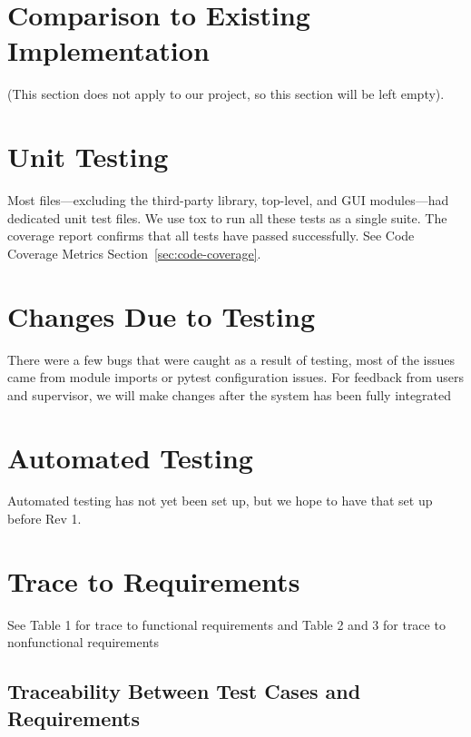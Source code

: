 \documentclass[12pt, titlepage]{article}
\begin{document}
\section{Comparison to Existing Implementation}	

(This section does not apply to our project, so this section will be left empty).

\section{Unit Testing}
Most files—excluding the third-party library, top-level, and GUI modules—had dedicated unit test files. 
We use tox to run all these tests as a single suite. 
The coverage report confirms that all tests have passed successfully. 
See Code Coverage Metrics Section~\ref{sec:code-coverage}.

\section{Changes Due to Testing}
There were a few bugs that were caught as a result of testing, most of the issues came from module imports or pytest configuration issues. For feedback from users and supervisor, we will make changes after the system has been fully integrated

\section{Automated Testing}
Automated testing has not yet been set up, but we hope to have that set up before Rev 1.
		
\section{Trace to Requirements}
See Table 1 for trace to functional requirements and Table 2 and 3 for trace to nonfunctional requirements
\subsection{Traceability Between Test Cases and Requirements}
\end{document}
